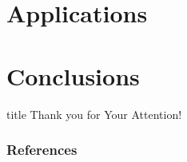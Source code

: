 \documentclass[aspectratio=169]{beamer}
\begin{document}
\section{Applications}

\section{Conclusions}

\begin{frame}
  \vfill
  \centering
  \begin{beamercolorbox}[sep=8pt,center,shadow=true,rounded=true]{title}
    Thank you for Your Attention!%
    \par%
  \end{beamercolorbox}
  \vfill
\end{frame}

\begin{frame}
  \frametitle{References}
  \AtNextBibliography{\tiny}
  \begin{multicols}{2}
    \nocite{*}
    \printbibliography
  \end{multicols}
\end{frame}
\end{document}
